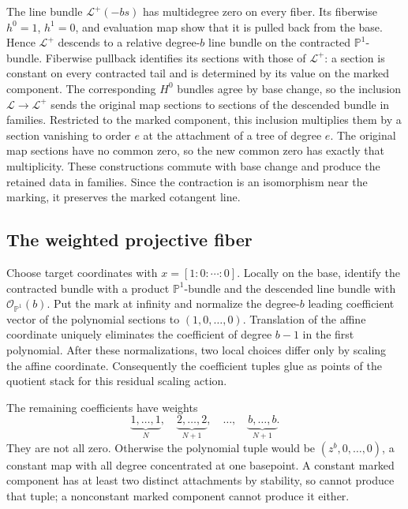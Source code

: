 The line bundle \(\mathcal L^+(-bs)\) has multidegree zero on every
fiber.  Its fiberwise \(h^0=1\), \(h^1=0\), and evaluation map show
that it is pulled back from the base.  Hence \(\mathcal L^+\)
descends to a relative degree-\(b\) line bundle on the contracted
\(\mathbb P^1\)-bundle.  Fiberwise pullback identifies its sections
with those of \(\mathcal L^+\): a section is constant on every
contracted tail and is determined by its value on the marked component.
The corresponding \(H^0\) bundles agree by base change, so the
inclusion \(\mathcal L\to\mathcal L^+\) sends the original map
sections to sections of the descended bundle in families.  Restricted
to the marked component, this inclusion multiplies them by a section
vanishing to order \(e\) at the attachment of a tree of degree \(e\).
The original map sections have no common zero, so the new common zero
has exactly that multiplicity.  These constructions commute with base
change and produce the retained data in families.  Since the
contraction is an isomorphism near the marking, it preserves the
marked cotangent line.

\subsection{The weighted projective fiber}

Choose target coordinates with \(x=[1:0:\cdots:0]\).  Locally on
the base, identify the contracted bundle with a product
\(\mathbb P^1\)-bundle and the descended line bundle with
\(\mathcal O_{\mathbb P^1}(b)\).  Put the mark at infinity and
normalize the degree-\(b\) leading coefficient vector of the
polynomial sections to \((1,0,\ldots,0)\).  Translation of the
affine coordinate uniquely eliminates the coefficient of degree
\(b-1\) in the first polynomial.  After these normalizations, two
local choices differ only by scaling the affine coordinate.
Consequently the coefficient tuples glue as points of the quotient
stack for this residual scaling action.

The remaining coefficients have weights
\[
  \underbrace{1,\ldots,1}_{N},\quad
  \underbrace{2,\ldots,2}_{N+1},\quad\ldots,\quad
  \underbrace{b,\ldots,b}_{N+1}.
\]
They are not all zero.  Otherwise the polynomial tuple would be
\((z^b,0,\ldots,0)\), a constant map with all degree concentrated at
one basepoint.  A constant marked component has at least two distinct
attachments by stability, so cannot produce that tuple; a
nonconstant marked component cannot produce it either.

